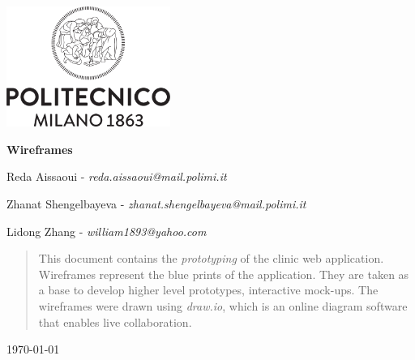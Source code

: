 \begin{titlepage}
\centering
\includegraphics[width=0.40\textwidth]{Design/resources/other/logo.png}\par
\vspace{1.5cm}
{\LARGE \textbf{Wireframes} \par}
\vspace{0.2cm}
{\large {}\par}
\vspace{1.0cm}
{\large Reda Aissaoui - \textit{reda.aissaoui@mail.polimi.it} \par}
{\large Zhanat Shengelbayeva - \textit{zhanat.shengelbayeva@mail.polimi.it} \par}
{\large Lidong Zhang  - \textit{william1893@yahoo.com} \par}
\vspace{2cm}
\begin{abstract} This document contains the {\it prototyping} of the clinic web application. Wireframes represent
  the blue prints of the application. They are taken as a base to develop higher level prototypes, interactive mock-ups.
  The wireframes were drawn using {\it draw.io}, which is an online diagram software that enables live collaboration.
\end{abstract}
\vfill
{\large \today \par}
\end{titlepage}
